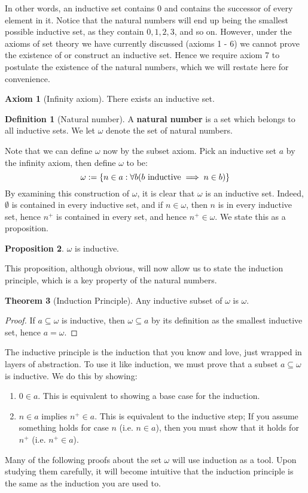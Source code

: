\documentclass[11pt, oneside]{article}   	%
\theoremstyle{definition}
\newtheorem{definition}{Definition}[section]
\newtheorem{theorem}{Theorem}[section]
\newtheorem{prop}[theorem]{Proposition}
\newtheorem{axiom}[theorem]{Axiom}
\begin{document}
In other words, an inductive set contains 0 and contains the successor of every element in it. Notice that the natural numbers 
will end up being the smallest possible inductive set, as they contain $0, 1, 2, 3$, and so on. However, under the axioms of set 
theory we have currently discussed (axioms 1 - 6) we cannot prove the existence of or construct an inductive set. Hence 
we require axiom 7 to postulate the existence of the natural numbers, which we will restate here for convenience.

\begin{axiom}[Infinity axiom]
	There exists an inductive set.
\end{axiom}
\begin{definition}[Natural number]
	A \textbf{natural number} is a set which belongs to all inductive sets. We let $\omega$ denote the set of natural numbers.
\end{definition}
Note that we can define $\omega$ now by the subset axiom. Pick an inductive set $a$ by the infinity axiom, then define 
$\omega$ to be:
\begin{equation}
	\omega := \{n\in a : \forall b (b\textnormal{ inductive}\implies n\in b)\}
\end{equation}
By examining this construction of $\omega$, it is clear that $\omega$ is an inductive set. Indeed, $\emptyset$ is contained 
in every inductive set, and if $n\in\omega$, then $n$ is in every inductive set, hence $n^+$ is contained in every set, and 
hence $n^+\in\omega$. We state this as a proposition.

\begin{prop}
	$\omega$ is inductive.
\end{prop}	

This proposition, although obvious, will now allow us to state the induction principle, which is a key property of the natural 
numbers. 
\begin{theorem}[Induction Principle]
	Any inductive subset of $\omega$ is $\omega$.
\end{theorem}
\begin{proof}
	If $a\subseteq\omega$ is inductive, then $\omega\subseteq a$ by its definition as the smallest inductive set, hence 
	$a = \omega$.
\end{proof}

The inductive principle is the induction that you know and love, just wrapped in layers of abstraction. To use it like induction, 
we must prove that a subset $a\subseteq\omega$ is inductive. We do this by showing:
\begin{enumerate}
	\item $0\in a$. This is equivalent to showing a base case for the induction.
	\item $n\in a$ implies $n^+\in a$. This is equivalent to the inductive step; If you assume something holds for case $n$ 
	(i.e. $n\in a$), then you must show that it holds for $n^+$ (i.e. $n^+\in a$). 
\end{enumerate}
Many of the following proofs about the set $\omega$ will use induction as a tool. Upon studying them carefully, it will become 
intuitive that the induction principle is the same as the induction you are used to.
\end{document}
